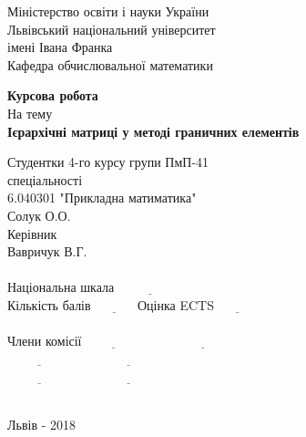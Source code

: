 \documentclass[12pt]{report}
\begin{document}
\begin{titlepage}
\begin{center}
{\Large Міністерство освіти і науки України\\}
\large  {Львівський національний університет\\імені Івана Франка\\ Кафедра обчислювальної математики}\\
\end{center}
\vspace*{3cm}
\begin{center}

\Large{\textbf{Курсова робота}}\\
\large{На тему}\\
\Large{\textbf{Ієрархічні матриці у методі
		 граничних елементів}}
\end{center}
\normalsize
\vspace*{4cm}\hspace*{8cm}Студентки 4-го курсу групи ПмП-41 \\
\hspace*{8cm}спеціальності \\
\hspace*{8cm}6.040301 "Прикладна матиматика"\\
\hspace*{8cm}Солук О.О.\\

\hspace*{7.1cm}Керівник\\
\hspace*{8cm}Вавричук В.Г.\\
 \\
\hspace*{8cm}\small{Національна шкала} $\underline{ \quad \quad \quad \quad \quad}$\\
\hspace*{8cm}\small{Кількість балів} $\underline{ \quad \quad\quad}$ \small{Оцінка ECTS} $\underline{ \quad \quad \quad}$\\
 \\
\hspace*{4.4cm}\normalsize{Члени комісії}\hspace*{1cm}$\underline{ \quad \quad \quad \quad \quad}$\hspace*{0.5cm}$\underline{ \quad \quad \quad \quad \quad\quad \quad\quad \quad}$\\
\hspace*{8cm}$\underline{ \quad \quad \quad \quad \quad}$\hspace*{0.5cm}$\underline{ \quad \quad \quad \quad \quad\quad \quad\quad \quad}$\\
\hspace*{8cm}$\underline{ \quad \quad \quad \quad \quad}$\hspace*{0.5cm}$\underline{ \quad \quad \quad \quad \quad\quad \quad\quad \quad}$\\
\vspace*{2.5cm}\\
\begin{center}
Львів - 2018
\end{center}
\end{titlepage}
\end{document}
